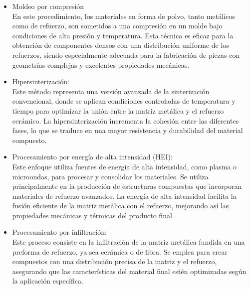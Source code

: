 \documentclass[letterpaper, 12pt]{article}
\begin{document}
\begin{itemize}
      \item Moldeo por compresión \\ En este procedimiento, los materiales en forma de
            polvo, tanto metálicos como de refuerzo, son sometidos a una compresión en un
            molde bajo condiciones de alta presión y temperatura. Esta técnica es eficaz
            para la obtención de componentes densos con una distribución uniforme de los
            refuerzos, siendo especialmente adecuada para la fabricación de piezas con
            geometrías complejas y excelentes propiedades mecánicas.
      \item Hipersinterización: \\ Este método representa una versión avanzada de la
            sinterización convencional, donde se aplican condiciones controladas de
            temperatura y tiempo para optimizar la unión entre la matriz metálica y el
            refuerzo cerámico. La hipersinterización incrementa la cohesión entre las
            diferentes fases, lo que se traduce en una mayor resistencia y durabilidad del
            material compuesto.

      \item Procesamiento por energía de alta intensidad (HEI): \\ Este enfoque utiliza
            fuentes de energía de alta intensidad, como plasma o microondas, para procesar
            y consolidar los materiales. Se utiliza principalmente en la producción de
            estructuras compuestas que incorporan materiales de refuerzo avanzados. La
            energía de alta intensidad facilita la fusión eficiente de la matriz metálica
            con el refuerzo, mejorando así las propiedades mecánicas y térmicas del
            producto final.

      \item Procesamiento por infiltración: \\ Este proceso consiste en la infiltración de
            la matriz metálica fundida en una preforma de refuerzo, ya sea cerámica o de
            fibra. Se emplea para crear compuestos con una distribución precisa de la
            matriz y el refuerzo, asegurando que las características del material final
            estén optimizadas según la aplicación específica.


\end{itemize}
\end{document}
